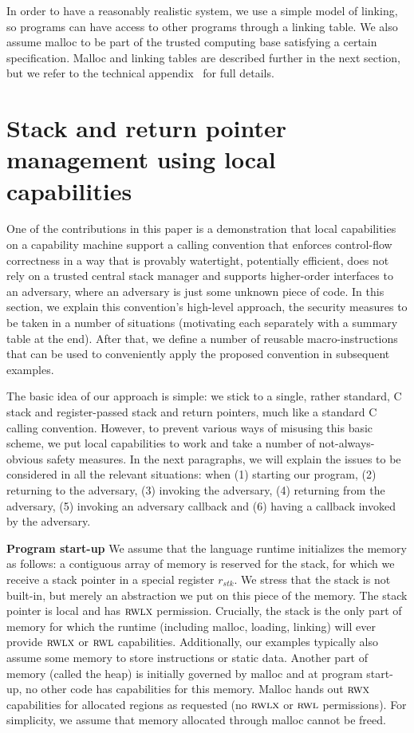 \documentclass{llncs}
\newcommand{\var}[1]{\mathit{#1}}
\newcommand{\stk}{\var{stk}}
\newcommand{\plainperm}[1]{\textsc{#1}}
\newcommand{\rwx}{\plainperm{rwx}}
\newcommand{\readwritel}{\plainperm{rwl}}
\newcommand{\rwl}{\readwritel}
\newcommand{\rwlx}{\plainperm{rwlx}}
\begin{document}

In order to have a reasonably realistic system, we use a simple model of
linking, so programs can have access to other programs through a linking table.
We also assume malloc to be part of the trusted computing base satisfying a
certain specification. Malloc and linking tables are described further in the
next section, but we refer to the technical appendix~\cite{technical_appendix}
for full details.

\section{Stack and return pointer management using local capabilities}
\label{sec:stack-and-return-pointer} One of the contributions in this paper is a
demonstration that local capabilities on a capability machine support a calling
convention that enforces control-flow correctness in a way that is provably
watertight, potentially efficient, does not rely on a trusted central stack
manager and supports higher-order interfaces to an adversary, where an adversary
is just some unknown piece of code. In this section, we explain this
convention's high-level approach, the security measures to be taken in a number
of situations (motivating each separately with a summary table at the end).
After that, we define a number of reusable macro-instructions that can be used
to conveniently apply the proposed convention in subsequent examples.

The basic idea of our approach is simple: we stick to a single, rather standard,
C stack and register-passed stack and return pointers, much like a standard C
calling convention. However, to prevent various ways of misusing this basic
scheme, we put local capabilities to work and take a number of
not-always-obvious safety measures. In the next paragraphs, we will explain the
issues to be considered in all the relevant situations: when (1) starting our
program, (2) returning to the adversary, (3) invoking the adversary, (4)
returning from the adversary, (5) invoking an adversary callback and (6) having
a callback invoked by the adversary.

\textbf{Program start-up} We assume that the language runtime initializes the
memory as follows: a contiguous array of memory is reserved for the stack, for
which we receive a stack pointer in a special register $r_\stk$. We stress that
the stack is not built-in, but merely an abstraction we put on this piece of the
memory. The stack pointer is local and has $\rwlx$ permission. Crucially, the
stack is the only part of memory for which the runtime (including malloc,
loading, linking) will ever provide $\rwlx$ or $\rwl$ capabilities.
Additionally, our examples typically also assume some memory to store
instructions or static data. Another part of memory (called the heap) is
initially governed by malloc and at program start-up, no other code has
capabilities for this memory. Malloc hands out $\rwx$ capabilities for allocated
regions as requested (no $\rwlx$ or $\rwl$ permissions). For simplicity, we
assume that memory allocated through malloc cannot be freed.
\end{document}
